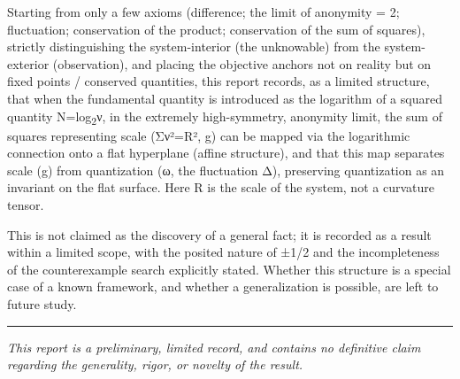 \documentclass[11pt]{ltjsarticle}
\begin{document}
Starting from only a few axioms (difference; the limit of anonymity = 2;
fluctuation; conservation of the product; conservation of the sum of
squares), strictly distinguishing the system-interior (the unknowable)
from the system-exterior (observation), and placing the objective
anchors not on reality but on fixed points / conserved quantities, this
report records, as a limited structure, that when the fundamental
quantity is introduced as the logarithm of a squared quantity N=log\textsubscript{2}ν,
in the extremely high-symmetry, anonymity limit, the sum of squares
representing scale (Σν²=R², g) can be mapped via the logarithmic
connection onto a flat hyperplane (affine structure), and that this map
separates scale (g) from quantization (ω, the fluctuation Δ), preserving
quantization as an invariant on the flat surface. Here R is the scale of
the system, not a curvature tensor.

This is not claimed as the discovery of a general fact; it is recorded
as a result within a limited scope, with the posited nature of ±1/2 and
the incompleteness of the counterexample search explicitly stated.
Whether this structure is a special case of a known framework, and
whether a generalization is possible, are left to future study.

\begin{center}\rule{0.5\linewidth}{0.5pt}\end{center}

\emph{This report is a preliminary, limited record, and contains no
definitive claim regarding the generality, rigor, or novelty of the
result.}
\end{document}
